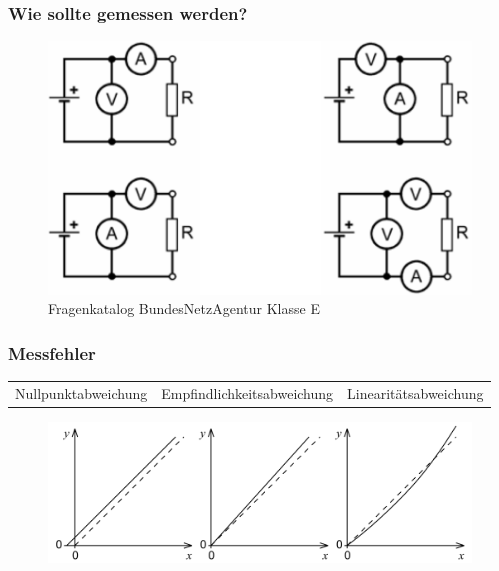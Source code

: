 \begin{frame}
  \frametitle{Wie sollte gemessen werden?}
  \begin{figure}
    \includegraphics[width=1\textwidth,height=.75\textheight,keepaspectratio]{e17/stromSpannung.png}
    \caption{Fragenkatalog BundesNetzAgentur Klasse E}
  \end{figure}
\end{frame}

\begin{frame}
  \frametitle{Messfehler}
  \begin{center}
    \begin{tabular}{ccc}
      Nullpunktabweichung & Empfindlichkeitsabweichung & Linearitätsabweichung
    \end{tabular}
    \begin{figure}
      \includegraphics[width=1\textwidth,height=.6\textheight]{e17/werMisstMisst.png}
    \end{figure}
  \end{center}
\end{frame}


